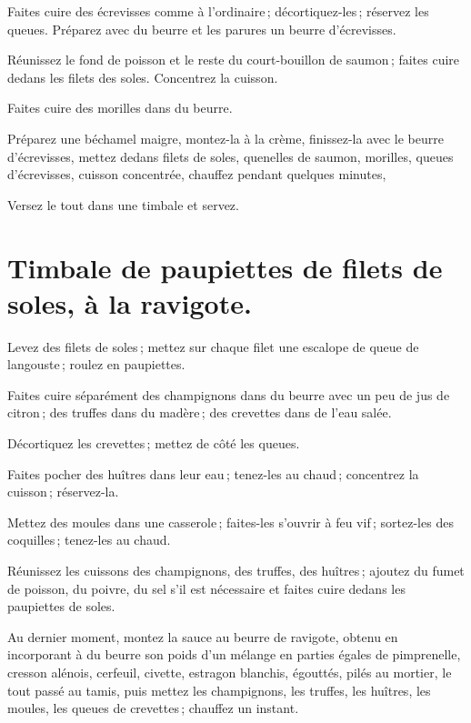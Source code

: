 Faites cuire des écrevisses comme à l'ordinaire ; décortiquez-les ; réservez
les queues. Préparez avec du beurre et les parures un beurre d'écrevisses.

Réunissez le fond de poisson et le reste du court-bouillon de saumon ; faites
cuire dedans les filets des soles. Concentrez la cuisson.

Faites cuire des morilles dans du beurre.

Préparez une béchamel maigre, montez-la à la crème, finissez-la avec le beurre
d'écrevisses, mettez dedans filets de soles, quenelles de saumon, morilles,
queues d'écrevisses, cuisson concentrée, chauffez pendant quelques minutes,

Versez le tout dans une timbale et servez.

\section*{\centering Timbale de paupiettes de filets de soles, à la ravigote.}

Levez des filets de soles ; mettez sur chaque filet une escalope de queue de
langouste ; roulez en paupiettes.

Faites cuire séparément des champignons dans du beurre avec un peu de jus de
citron ; des truffes dans du madère ; des crevettes dans de l'eau salée.

Décortiquez les crevettes ; mettez de côté les queues.

Faites pocher des huîtres dans leur eau ; tenez-les au chaud ; concentrez la
cuisson ; réservez-la.

Mettez des moules dans une casserole ; faites-les s'ouvrir à feu vif ;
sortez-les des coquilles ; tenez-les au chaud.

Réunissez les cuissons des champignons, des truffes, des huîtres ; ajoutez du
fumet de poisson, du poivre, du sel s'il est nécessaire et faites cuire dedans
les paupiettes de soles.

Au dernier moment, montez la sauce au beurre de ravigote, obtenu en incorporant
à du beurre son poids d'un mélange en parties égales de pimprenelle, cresson
alénois, cerfeuil, civette, estragon blanchis, égouttés, pilés au mortier, le
tout passé au tamis, puis mettez les champignons, les truffes, les huîtres, les
moules, les queues de crevettes ; chauffez un instant.

